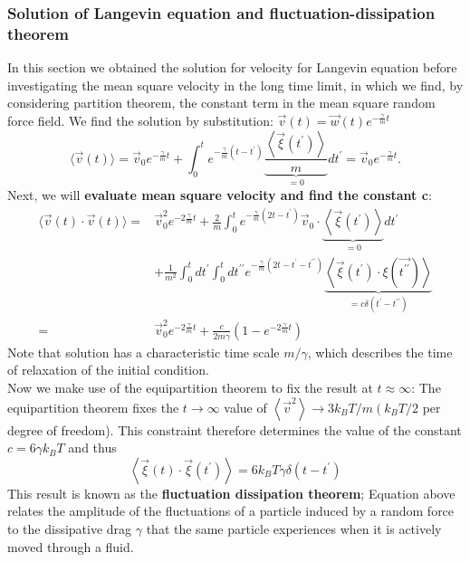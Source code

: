 \documentclass[12pt,a4paper]{article}
\begin{document}
\subsubsection{Solution of Langevin equation and fluctuation-dissipation theorem}
In this section we obtained the solution for velocity for Langevin equation before investigating the mean square velocity in the long time limit, in which we find, by considering partition theorem, the constant term in the mean square random force field. We find the solution by substitution: $\vec{v}(t)=\vec{w}(t) e^{-\frac{\gamma}{m} t}$
$$
\langle\vec{v}(t)\rangle=\vec{v}_0 e^{-\frac{\gamma}{m} t}+\int_0^t e^{-\frac{\gamma}{m}\left(t-t^{\prime}\right)} \underbrace{\frac{\left\langle\vec{\xi}\left(t^{\prime}\right)\right\rangle}{m}}_{=0} d t^{\prime}=\vec{v}_0 e^{-\frac{\gamma}{m} t} .
$$
Next, we will \textbf{evaluate mean square velocity and find the constant c}:
\begin{align}
    \langle\vec{v}(t) \cdot \vec{v}(t)\rangle= & \vec{v}_0^2 e^{-2 \frac{\gamma}{m} t}+\frac{2}{m} \int_0^t e^{-\frac{\gamma}{m}\left(2 t-t^{\prime}\right)} \vec{v}_0 \cdot \underbrace{\left\langle\vec{\xi}\left(t^{\prime}\right)\right\rangle}_{=0} d t^{\prime} \\
    & +\frac{1}{m^2} \int_0^t d t^{\prime} \int_0^t d t^{\prime \prime} e^{-\frac{\gamma}{m}\left(2 t-t^{\prime}-t^{\prime \prime}\right)} \underbrace{\left\langle\vec{\xi}\left(t^{\prime}\right) \cdot \xi\left(\overrightarrow{t^{\prime \prime}}\right)\right\rangle}_{=c \delta\left(t^{\prime}-t^{\prime \prime}\right)} \\
    = & \vec{v}_0^2 e^{-2 \frac{\gamma}{m} t}+\frac{c}{2 m \gamma}\left(1-e^{-2 \frac{\gamma}{m} t}\right)
\end{align}
Note that solution has a characteristic time scale $m/\gamma$, which describes the time of relaxation of the initial condition.\\
Now we make use of the equipartition theorem to fix the result at $t\approx \infty$:
The equipartition theorem fixes the $t \rightarrow \infty$ value of $\left\langle\vec{v}^2\right\rangle \rightarrow 3 k_B T / m\left(k_B T / 2\right.$ per degree of freedom). This constraint therefore determines the value of the constant $c=6 \gamma k_B T$ and thus
$$
\left\langle\vec{\xi}(t) \cdot \vec{\xi}\left(t^{\prime}\right)\right\rangle=6 k_B T \gamma \delta\left(t-t^{\prime}\right)
$$
This result is known as the \textbf{fluctuation dissipation theorem}; Equation above relates the amplitude of the fluctuations of a particle induced by a random force to the dissipative drag $\gamma$ that the same particle experiences when it is actively moved through a fluid.
\end{document}
